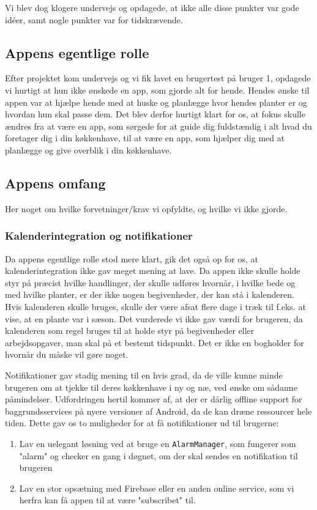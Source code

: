Vi blev dog klogere undervejs og opdagede, at ikke alle disse punkter var gode idéer, samt nogle punkter var for tidskrævende.

\subsection{Appens egentlige rolle}
Efter projektet kom undervejs og vi fik lavet en brugertest på bruger 1, opdagede vi hurtigt at hun ikke ønskede en app, som gjorde alt for hende. Hendes ønske til appen var at hjælpe hende med at huske og planlægge hvor hendes planter er og hvordan hun skal passe dem. Det blev derfor hurtigt klart for os, at fokus skulle ændres fra at være en app, som sørgede for at guide dig fuldstændig i alt hvad du foretager dig i din køkkenhave, til at være en app, som hjælper dig med at planlægge og give overblik i din køkkenhave.

\subsection{Appens omfang}
Her noget om hvilke forvetninger/krav vi opfyldte, og hvilke vi ikke gjorde.

\subsubsection{Kalenderintegration og notifikationer}
Da appens egentlige rolle stod mere klart, gik det også op for os, at kalenderintegration ikke gav meget mening at lave. Da appen ikke skulle holde styr på præcist hvilke handlinger, der skulle udføres hvornår, i hvilke bede og med hvilke planter, er der ikke nogen begivenheder, der kan stå i kalenderen. Hvis kalenderen skulle bruges, skulle der være afsat flere dage i træk til f.eks. at vise, at en plante var i sæson. Det vurderede vi ikke gav værdi for brugeren, da kalenderen som regel bruges til at holde styr på begivenheder eller arbejdsopgaver, man skal på et bestemt tidspunkt. Det er ikke en bogholder for hvornår du måske vil gøre noget.

Notifikationer gav stadig mening til en hvis grad, da de ville kunne minde brugeren om at tjekke til deres køkkenhave i ny og næ, ved ønske om sådanne påmindelser. Udfordringen hertil kommer af, at der er dårlig offline support for baggrundsservices på nyere versioner af Android, da de kan dræne ressourcer hele tiden. Dette gav os to muligheder for at få notifikationer ud til brugerne:

\begin{enumerate}
    \item Lav en uelegant løsning ved at bruge en \texttt{AlarmManager}, som fungerer som "alarm" og checker en gang i døgnet, om der skal sendes en notifikation til brugeren
    \item Lav en stor opsætning med Firebase eller en anden online service, som vi herfra kan få appen til at være "subscribet" til.
\end{enumerate}

